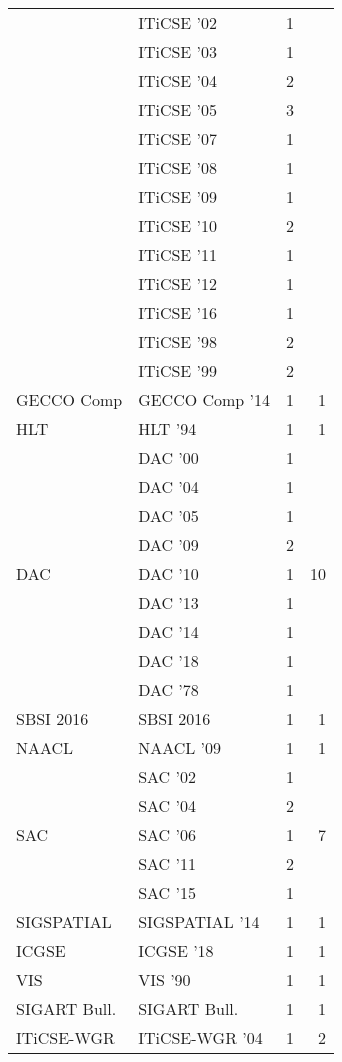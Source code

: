 \begin{table*}[t]
\begin{tabular}{llrr}
& ITiCSE '02 & 1 &\\
& ITiCSE '03 & 1 &\\
& ITiCSE '04 & 2 &\\
& ITiCSE '05 & 3 &\\
& ITiCSE '07 & 1 &\\
& ITiCSE '08 & 1 &\\
& ITiCSE '09 & 1 &\\
& ITiCSE '10 & 2 &\\
& ITiCSE '11 & 1 &\\
& ITiCSE '12 & 1 &\\
& ITiCSE '16 & 1 &\\
& ITiCSE '98 & 2 &\\
& ITiCSE '99 & 2 &\\
\multirow{1}{*}{GECCO Comp } & GECCO Comp '14 & 1 & \multirow{1}{*}{1}\\
\multirow{1}{*}{HLT } & HLT '94 & 1 & \multirow{1}{*}{1}\\
\multirow{9}{*}{DAC } & DAC '00 & 1 & \multirow{9}{*}{10}\\
& DAC '04 & 1 &\\
& DAC '05 & 1 &\\
& DAC '09 & 2 &\\
& DAC '10 & 1 &\\
& DAC '13 & 1 &\\
& DAC '14 & 1 &\\
& DAC '18 & 1 &\\
& DAC '78 & 1 &\\
\multirow{1}{*}{SBSI 2016} & SBSI 2016 & 1 & \multirow{1}{*}{1}\\
\multirow{1}{*}{NAACL } & NAACL '09 & 1 & \multirow{1}{*}{1}\\
\multirow{5}{*}{SAC } & SAC '02 & 1 & \multirow{5}{*}{7}\\
& SAC '04 & 2 &\\
& SAC '06 & 1 &\\
& SAC '11 & 2 &\\
& SAC '15 & 1 &\\
\multirow{1}{*}{SIGSPATIAL } & SIGSPATIAL '14 & 1 & \multirow{1}{*}{1}\\
\multirow{1}{*}{ICGSE } & ICGSE '18 & 1 & \multirow{1}{*}{1}\\
\multirow{1}{*}{VIS } & VIS '90 & 1 & \multirow{1}{*}{1}\\
\multirow{1}{*}{SIGART Bull.} & SIGART Bull. & 1 & \multirow{1}{*}{1}\\
\multirow{2}{*}{ITiCSE-WGR } & ITiCSE-WGR '04 & 1 & \multirow{2}{*}{2}\\

\end{tabular}
\end{table*}
